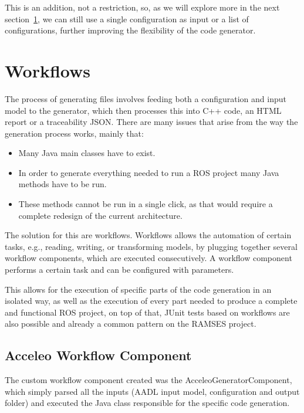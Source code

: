This is an addition, not a restriction, so, as we will explore more in the next section~\ref{sec:workflows}, we can still use a single configuration as input or a list of configurations, further improving the flexibility of the code generator.


\section{Workflows}
\label{sec:workflows}

The process of generating files involves feeding both a configuration and input model to the generator, which then processes this into C++ code, an \gls{HTML} report or a traceability \gls{JSON}. There are many issues that arise from the way the generation process works, mainly that:

\begin{itemize} 
	\item Many Java main classes have to exist.
	\item In order to generate everything needed to run a \gls{ROS} project many Java methods have to be run.
	\item These methods cannot be run in a single click, as that would require a complete redesign of the current architecture.
\end{itemize}


The solution for this are workflows. Workflows allows the automation of certain tasks, e.g., reading, writing, or transforming models, by plugging together several workflow components, which are executed consecutively. A workflow component performs a certain task and can be configured with parameters.

This allows for the execution of specific parts of the code generation in an isolated way, as well as the execution of every part needed to produce a complete and functional \gls{ROS} project, on top of that, \gls{JUnit} tests based on workflows are also possible and already a common pattern on the \gls{RAMSES} project.

\subsection{Acceleo Workflow Component}
\label{sec:workflows_acceleo}

The custom workflow component created was the AcceleoGeneratorComponent, which simply parsed all the inputs (AADL input model, configuration and output folder) and executed the Java class responsible for the specific code generation.


